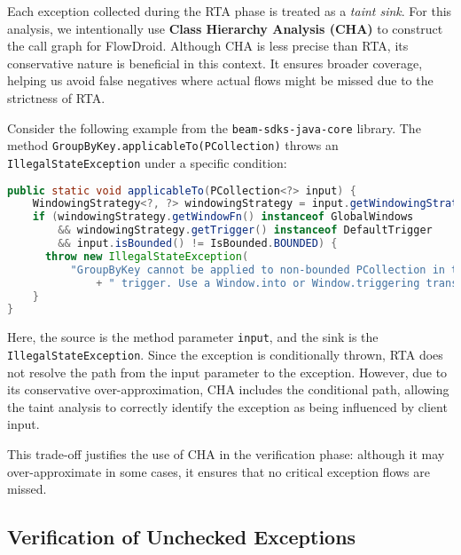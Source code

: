 Each exception collected during the RTA phase is treated as a \textit{taint sink}. For this analysis, we intentionally use \textbf{Class Hierarchy Analysis (CHA)} to construct the call graph for FlowDroid. Although CHA is less precise than RTA, its conservative nature is beneficial in this context. It ensures broader coverage, helping us avoid false negatives where actual flows might be missed due to the strictness of RTA.

Consider the following example from the \texttt{beam-sdks-java-core} library. The method \texttt{GroupByKey.applicableTo(PCollection)} throws an \texttt{IllegalStateException} under a specific condition:
\begin{lstlisting}[language=Java,breaklines=true,breakatwhitespace=false,basicstyle=\scriptsize\ttfamily]
public static void applicableTo(PCollection<?> input) {
    WindowingStrategy<?, ?> windowingStrategy = input.getWindowingStrategy();
    if (windowingStrategy.getWindowFn() instanceof GlobalWindows
        && windowingStrategy.getTrigger() instanceof DefaultTrigger
        && input.isBounded() != IsBounded.BOUNDED) {
      throw new IllegalStateException(
          "GroupByKey cannot be applied to non-bounded PCollection in the GlobalWindow without a"
              + " trigger. Use a Window.into or Window.triggering transform prior to GroupByKey.");
    }
}
\end{lstlisting}

Here, the source is the method parameter \texttt{input}, and the sink is the \texttt{IllegalStateException}. Since the exception is conditionally thrown, RTA does not resolve the path from the input parameter to the exception. However, due to its conservative over-approximation, CHA includes the conditional path, allowing the taint analysis to correctly identify the exception as being influenced by client input.

This trade-off justifies the use of CHA in the verification phase: although it may over-approximate in some cases, it ensures that no critical exception flows are missed.


\subsection{Verification of Unchecked Exceptions}
